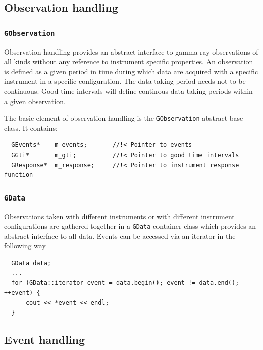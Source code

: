 \documentclass{article}[12pt,a4]
\begin{document}
\subsection{Observation handling}

\subsubsection{{\tt GObservation}}

Observation handling provides an abstract interface to gamma-ray observations of all kinds
without any reference to instrument specific properties.
An observation is defined as a given period in time during which data are acquired with a
specific instrument in a specific configuration.
The data taking period needs not to be continuous.
Good time intervals will define continous data taking periods within a given observation.

The basic element of observation handling is the {\tt GObservation} abstract base class.
It contains:
\begin{verbatim}
  GEvents*    m_events;       //!< Pointer to events
  GGti*       m_gti;          //!< Pointer to good time intervals
  GResponse*  m_response;     //!< Pointer to instrument response function
\end{verbatim}


\subsubsection{{\tt GData}}

Observations taken with different instruments or with different instrument configurations are
gathered together in a {\tt GData} container class which provides an abstract interface to all 
data.
Events can be accessed via an iterator in the following way
\begin{verbatim}
  GData data;
  ...
  for (GData::iterator event = data.begin(); event != data.end(); ++event) {
      cout << *event << endl;
  }
\end{verbatim}



\subsection{Event handling}
\end{document}
